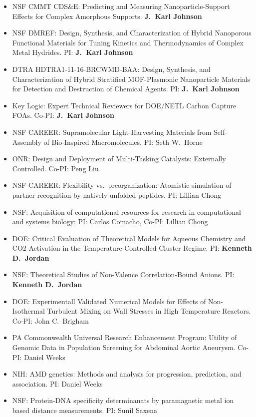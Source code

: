 \begin{itemize}
	\item NSF CMMT CDS\&E: Predicting and Measuring Nanoparticle-Support Effects for Complex Amorphous Supports. \textbf{J.\ Karl Johnson}

	\item NSF DMREF: Design, Synthesis, and Characterization of Hybrid Nanoporous Functional Materials for Tuning Kinetics and Thermodynamics of Complex Metal Hydrides.  PI: \textbf{J.\ Karl Johnson}

	\item DTRA HDTRA1-11-16-BRCWMD-BAA: Design, Synthesis, and Characterization of Hybrid Stratified MOF-Plasmonic Nanoparticle Materials for Detection and Destruction of Chemical Agents.  PI: \textbf{J.\ Karl Johnson}

	\item Key Logic: Expert Technical Reviewers for DOE/NETL Carbon Capture FOAs. Co-PI: \textbf{J.\ Karl Johnson}

        \item NSF CAREER: Supramolecular Light-Harvesting Materials from Self-Assembly of Bio-Inspired Macromolecules.  PI: Seth W.\ Horne

        \item ONR: Design and Deployment of Multi-Tasking Catalysts: Externally Controlled. Co-PI: Peng Liu

        \item NSF CAREER: Flexibility vs.\ preorganization: Atomistic simulation of partner recognition by natively unfolded peptides. PI: Lillian Chong

        \item NSF: Acquisition of computational resources for research in computational and systems biology: PI: Carlos Comacho, Co-PI: Lillian Chong

        \item DOE: Critical Evaluation of Theoretical Models for Aqueous Chemistry and CO2 Activation in the Temperature-Controlled Cluster Regime. PI: \textbf{Kenneth D.\ Jordan}

        \item NSF: Theoretical Studies of Non-Valence Correlation-Bound Anions.  PI: \textbf{Kenneth D.\ Jordan}

        \item DOE: Experimentall Validated Numerical Models for Effects of Non-Isothermal Turbulent Mixing on Wall Stresses in High Temperature Reactors.  Co-PI: John C.\ Brigham

        \item PA Commonwealth Universal Research Enhancement Program: Utility of Genomic Data in Population Screening for Abdominal Aortic Aneurysm.  Co-PI: Daniel Weeks

        \item NIH: AMD genetics: Methods and analysis for progression, prediction, and association.  PI: Daniel Weeks

        \item NSF: Protein-DNA specificity determinanats by paramagnetic metal ion based distance measurements.  PI: Sunil Saxena

\end{itemize}



